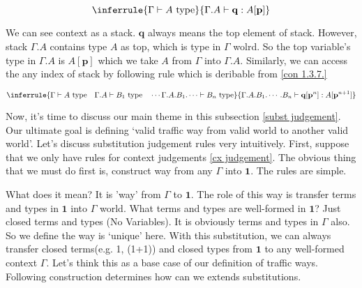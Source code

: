 \documentclass[12pt, a4paper, openany, twoside]{book}
\theoremstyle{definition}
\theoremstyle{remark}
\theoremstyle{plain}
\numberwithin{equation}{section}
\begin{document}
\begin{tcolorbox}[colback=yellow!10!white,colframe=green!75!black,title=Construction 1.3.7.]\label{con 1.3.7.}
\[
\inferrule
{\Gamma \vdash A \text{ type}}
{\Gamma.A \vdash \mathbf{q} : A[\mathbf{p}]}
\]
\end{tcolorbox}
We can see context as a stack. $\mathbf{q}$ always means the top element of stack. 
However, stack $\Gamma.A$ contains type $A$ as top, which is type in $\Gamma$ wolrd. So 
the top variable's type in $\Gamma.A$ is $A[\mathbf{p}]$ which we take $A$ from $\Gamma$ into $\Gamma.A$. Similarly, we can 
access the any index of stack by following rule which is deribable from \ref{con 1.3.7.} 
\begin{tcolorbox}[colback=yellow!10!white,colframe=red!75!black,title=Corolary 1.3.8.]
\[
\inferrule
{\Gamma \vdash A \text{ type} \quad \Gamma.A \vdash B_1 \text{ type} \quad \cdots \Gamma.A.B_1.\cdots \vdash B_n \text{ type}}
{\Gamma.A.B_1.\cdots.B_n \vdash \mathbf{q}[\mathbf{p}^n] : A[\mathbf{p}^{n+1}]}
\]
\end{tcolorbox}
Now, it's time to discuss our main theme in this subsection \ref{subst judgement}.
Our ultimate goal is defining \lq valid traffic way from valid world to another valid world'. Let's discuss substitution 
judgement rules very intuitively. First, suppose that we only have rules for context judgements \ref{cx judgement}. 
The obvious thing that we must do first is, construct way from any $\Gamma$ into $\mathbf{1}$. The rules are simple. 
\begin{tcolorbox}[colback=yellow!10!white,colframe=green!75!black,title=Construction 1.3.9.]
\end{tcolorbox}
\vspace{4mm}
What does it mean? It is 'way' from $\Gamma$ to $\mathbf{1}$. The role of this way is transfer terms and types in $\mathbf{1}$ into $\Gamma$ world. 
What terms and types are well-formed in $\mathbf{1}$? Just closed terms and types (No Variables). It is obviously 
terms and types in $\Gamma$ also. So we define the way is \lq unique' here. With this substitution, 
we can always transfer closed terms(e.g. 1, (1+1)) and closed types from $\mathbf{1}$ to any well-formed context $\Gamma$.  
Let's think this as a base case of our definition of traffic ways. Following construction determines how can we extends substitutions. 
\end{document}

